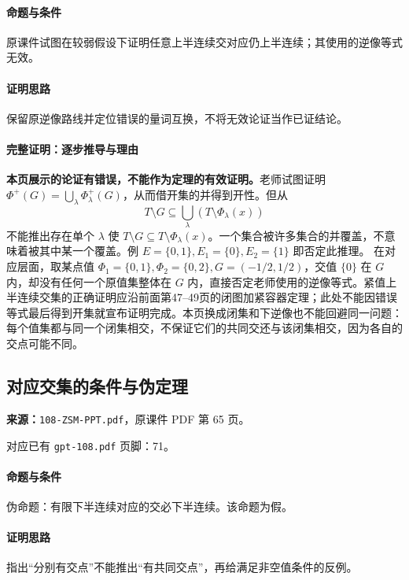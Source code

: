 \paragraph{命题与条件}原课件试图在较弱假设下证明任意上半连续交对应仍上半连续；其使用的逆像等式无效。
\paragraph{证明思路}保留原逆像路线并定位错误的量词互换，不将无效论证当作已证结论。
\paragraph{完整证明：逐步推导与理由}
\textbf{本页展示的论证有错误，不能作为定理的有效证明。}老师试图证明 $\Phi^+(G)=\bigcup_\lambda\Phi_\lambda^+(G)$，从而借开集的并得到开性。但从
\[T\setminus G\subseteq\bigcup_\lambda(T\setminus\Phi_\lambda(x))\]
不能推出存在单个 $\lambda$ 使 $T\setminus G\subseteq T\setminus\Phi_\lambda(x)$。一个集合被许多集合的并覆盖，不意味着被其中某一个覆盖。例 $E=\{0,1\},E_1=\{0\},E_2=\{1\}$ 即否定此推理。
在对应层面，取某点值 $\Phi_1=\{0,1\},\Phi_2=\{0,2\},G=(-1/2,1/2)$，交值 $\{0\}$ 在 $G$ 内，却没有任何一个原值集整体在 $G$ 内，直接否定老师使用的逆像等式。紧值上半连续交集的正确证明应沿前面第47--49页的闭图加紧容器定理；此处不能因错误等式最后得到开集就宣布证明完成。本页换成闭集和下逆像也不能回避同一问题：每个值集都与同一个闭集相交，不保证它们的共同交还与该闭集相交，因为各自的交点可能不同。
\clearpage\subsection{对应交集的条件与伪定理}
\textbf{来源：}\texttt{108-ZSM-PPT.pdf}，原课件 PDF 第 65 页。\par
对应已有 \texttt{gpt-108.pdf} 页脚：71。\par
\paragraph{命题与条件}伪命题：有限下半连续对应的交必下半连续。该命题为假。
\paragraph{证明思路}指出“分别有交点”不能推出“有共同交点”，再给满足非空值条件的反例。
